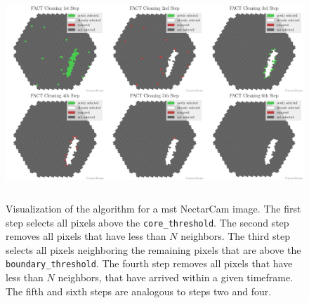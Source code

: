 \begin{figure}
    \centering
    \includegraphics[height=8cm]{plots/cleaner_steps/fact.pdf}
    \caption{Visualization of the \fact{} algorithm \cite{fact} for a \gls{mst} NectarCam image. The first
    step selects all pixels above the \texttt{core\_threshold}. The second step removes all pixels that have less than
    \(N\) neighbors. The third step selects all pixels neighboring the remaining pixels that are above the
    \texttt{boundary\_threshold}. The fourth step removes all pixels that have less than \(N\) neighbors,
    that have arrived within a given timeframe. The fifth and sixth steps are analogous to steps two and four.}
    \label{fig:fact_cleaning}
\end{figure}

